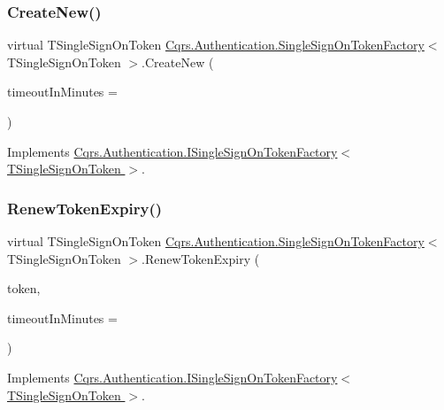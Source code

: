 \subsubsection{\texorpdfstring{Create\+New()}{CreateNew()}}
{\footnotesize\ttfamily virtual T\+Single\+Sign\+On\+Token \hyperlink{classCqrs_1_1Authentication_1_1SingleSignOnTokenFactory}{Cqrs.\+Authentication.\+Single\+Sign\+On\+Token\+Factory}$<$ T\+Single\+Sign\+On\+Token $>$.Create\+New (\begin{DoxyParamCaption}\item[{int}]{timeout\+In\+Minutes = {} }\end{DoxyParamCaption})\hspace{0.3cm}{\ttfamily [virtual]}}



Implements \hyperlink{interfaceCqrs_1_1Authentication_1_1ISingleSignOnTokenFactory_ad0795fb60ca13dd24db18556089e2834_ad0795fb60ca13dd24db18556089e2834}{Cqrs.\+Authentication.\+I\+Single\+Sign\+On\+Token\+Factory$<$ T\+Single\+Sign\+On\+Token $>$}.

\mbox{\label{classCqrs_1_1Authentication_1_1SingleSignOnTokenFactory_a699ceac65874b8319d2e26fa88f554be_a699ceac65874b8319d2e26fa88f554be}} 
\subsubsection{\texorpdfstring{Renew\+Token\+Expiry()}{RenewTokenExpiry()}}
{\footnotesize\ttfamily virtual T\+Single\+Sign\+On\+Token \hyperlink{classCqrs_1_1Authentication_1_1SingleSignOnTokenFactory}{Cqrs.\+Authentication.\+Single\+Sign\+On\+Token\+Factory}$<$ T\+Single\+Sign\+On\+Token $>$.Renew\+Token\+Expiry (\begin{DoxyParamCaption}\item[{T\+Single\+Sign\+On\+Token}]{token,  }\item[{int}]{timeout\+In\+Minutes = {} }\end{DoxyParamCaption})\hspace{0.3cm}{\ttfamily [virtual]}}



Implements \hyperlink{interfaceCqrs_1_1Authentication_1_1ISingleSignOnTokenFactory_ab436004ad1631140f7a58927cbacd8c4_ab436004ad1631140f7a58927cbacd8c4}{Cqrs.\+Authentication.\+I\+Single\+Sign\+On\+Token\+Factory$<$ T\+Single\+Sign\+On\+Token $>$}.

